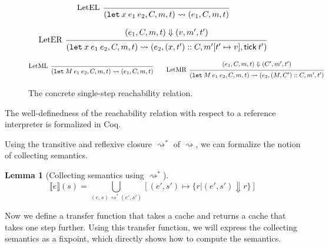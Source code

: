 \documentclass[acmsmall,screen,review]{acmart}
\theoremstyle{definition}
\newtheorem{lem}{Lemma}[section]
\newcommand*{\cons}{::}
\newcommand*{\mem}{m}
\newcommand*{\sembracket}[1]{\lBrack{#1}\rBrack}
\newcommand*{\tick}{\mathsf{tick}}
\begin{document}
\begin{figure}[htb]
  \[
    \begin{prooftree}
      \infer[left label=LetEL]0{
      (\mathtt{let}\:x\:e_1\:e_2, C, \mem, t)
      \rightsquigarrow
      (e_{1}, C, \mem, t)
      }
    \end{prooftree}
  \]

  \[
    \begin{prooftree}
      \hypo{
        \begin{matrix}
          (e_{1}, C, \mem, t)
          \Downarrow
          (v, \mem', t')
        \end{matrix}
      }
      \infer[left label=LetER]1{
      (\mathtt{let}\:x\:e_1\:e_2, C, \mem, t)
      \rightsquigarrow
      (e_{2}, (x, t')\cons C, \mem'[t'\mapsto v], \tick\:t')
      }
    \end{prooftree}
  \]

  \[
    \begin{prooftree}
      \infer[left label=LetML]0{
      (\mathtt{let}\:M\:e_{1}\:e_{2}, C, \mem, t)
      \rightsquigarrow
      (e_{1}, C, \mem, t)
      }
    \end{prooftree}\qquad
    \begin{prooftree}
      \hypo{
        \begin{matrix}
          (e_{1}, C, \mem, t)
          \Downarrow
          (C', \mem', t')
        \end{matrix}
      }
      \infer[left label=LetMR]1{
      (\mathtt{let}\:M\:e_{1}\:e_{2}, C, \mem, t)
      \rightsquigarrow
      (e_{2}, (M, C')\cons C, \mem', t')
      }
    \end{prooftree}
  \]
  \caption{The concrete single-step reachability relation.}
  \label{fig:concreach}
\end{figure}
The well-definedness of the reachability relation with respect to a reference interpreter is formalized in Coq.

Using the transitive and reflexive closure $\rightsquigarrow^{*}$ of $\rightsquigarrow$, we can formalize the notion of collecting semantics.

\begin{lem}[Collecting semantics using $\rightsquigarrow^{*}$]
  \[
    \sembracket{e}(s)=\bigcup_{(e,s)\rightsquigarrow^{*}(e',s')}[(e',s')\mapsto\{r|(e',s')\Downarrow r\}]
  \]
\end{lem}

Now we define a transfer function that takes a cache and returns a cache that takes one step further.
Using this transfer function, we will express the collecting semantics as a fixpoint, which directly shows how to compute the semantics.
\end{document}
